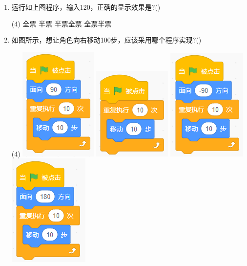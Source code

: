 \documentclass[10pt, a4paper]{article}
\begin{document}
\begin{enumerate}
        \item 运行如上图程序，输入120，正确的显示效果是?(\qquad)
        \begin{tasks}(4)
            \task 全票
            \task 半票
            \task 半票全票
            \task 全票半票
        \end{tasks}

        \newpage
        \item 如图所示，想让角色向右移动100步，应该采用哪个程序实现?(\qquad)
        \begin{tasks}(4)
            \task \includegraphics[width=.1\textwidth]{7a.png}
            \task \includegraphics[width=.12\textwidth]{7b.png}
            \task \includegraphics[width=.1\textwidth]{7c.png}
            \task \includegraphics[width=.1\textwidth]{7d.png}
        \end{tasks}


\end{enumerate}
\end{document}
